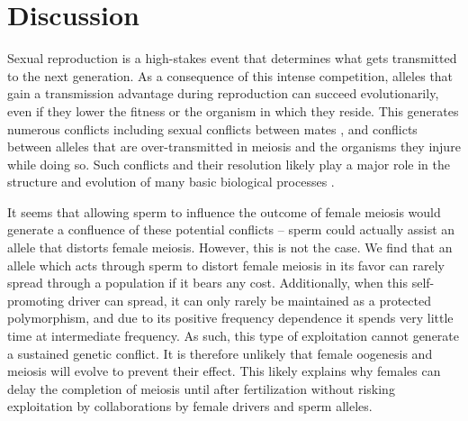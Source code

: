 \documentclass[12pt,letterpaper]{article}
\newcommand{\yb}[1]{{ \color{blue} #1}}
\begin{document}
\section*{Discussion}

Sexual reproduction is a high-stakes event that determines what gets transmitted to the next generation.  
As a consequence of this intense competition, alleles that gain a transmission advantage during reproduction 
	can succeed evolutionarily, even if they lower the 
        fitness or the organism in which they reside. 
This generates numerous conflicts  \cite{Burt2006} including sexual conflicts between mates \cite{Arnqvist2005}, 
	and conflicts between alleles that are over-transmitted in meiosis and the organisms they injure while doing so. 
Such conflicts and their resolution likely play a major role in the structure and evolution of many basic biological processes \citep{Rice2013}.

It seems that allowing sperm to influence the outcome of female meiosis would generate a confluence of these potential conflicts -- 
	sperm could actually assist an allele that distorts female meiosis.
However, this is not the case.
We find that an allele which acts through sperm to distort female meiosis in its favor %
	can rarely spread through a population if it bears any cost. 
Additionally, when this self-promoting driver can spread, it can only rarely 
	be maintained as a protected polymorphism, and due to its positive frequency dependence 
	it spends very little time at intermediate frequency.
As such, this type of exploitation cannot generate a sustained genetic conflict.
It is therefore unlikely
	that female oogenesis and meiosis will evolve to prevent their effect.  
This likely explains why females can delay the completion of meiosis until after fertilization 
	without risking exploitation by collaborations by female
        drivers and sperm alleles.
\end{document}
